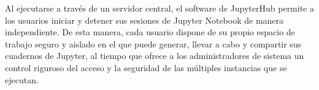 \begin{doublespace}
    Al ejecutarse a través de un servidor central, el software de JupyterHub permite a los usuarios iniciar y detener sus sesiones de Jupyter Notebook de manera independiente. De esta manera, cada usuario dispone de su propio espacio de trabajo seguro y aislado en el que puede generar, llevar a cabo y compartir sus cuadernos de Jupyter, al tiempo que ofrece a los administradores de sistema un control riguroso del acceso y la seguridad de las múltiples instancias que se ejecutan.

  \mylinespacing
  \mylinespacing
  \begin{tightcenter}
  \end{tightcenter}
\end{doublespace}